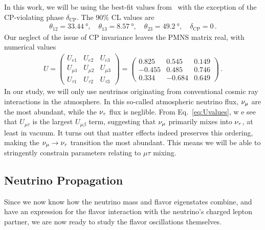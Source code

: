 In this work, we will be using the best-fit values from~\cite{nufit} with the exception of the CP-violating phase $\delta_\text{CP}$. The $90\% $ CL values are
\begin{align}\label{eq:nufitparams}
    \theta_{12} = \SI{33.44}{\degree},\hspace{1em} \theta_{13} = \SI{8.57}{\degree},\hspace{1em} \theta_{23} = \SI{49.2}{\degree}, \hspace{1em} \delta_\text{CP} = 0\,.
\end{align}
Our neglect of the issue of CP invariance leaves the PMNS matrix real, with numerical values 
\begin{align}\label{eq:Uvalues}
    U = \begin{pmatrix}
        U_{e 1} & U_{e2} & U_{e3} \\
        U_{\mu 1} & U_{\mu 2} & U_{\mu 3} \\
        U_{\tau 1} & U_{\tau 2} & U_{\tau 3}
    \end{pmatrix} 
    = \begin{pmatrix}
        0.825 & 0.545 & 0.149 \\
        -0.455 & 0.485 & 0.746 \\
        0.334 & -0.684 & 0.649
    \end{pmatrix} \,.
\end{align}
In our study, we will only use neutrinos originating from conventional cosmic ray interactions in the atmosphere. 
In this so-called atmospheric neutrino flux, $\nu_\mu$ are the most abundant, while the $\nu_\tau$ flux is neglible. From Eq.~\eqref{eq:Uvalues}, w
e see that $U_{\mu\tau}$ is the largest $U_{\mu\beta}$ term,
suggesting that $\nu_\mu$ primarily mixes into $\nu_\tau$, at least in vacuum. It turns out that matter effects indeed preserves this ordering, making the $\nu_\mu \to \nu_\tau$ transition
the most abundant. This means we will be able to stringently constrain parameters relating to $\mu\tau$ mixing.

\subsection{Neutrino Propagation}
Since we now know how the neutrino mass and flavor eigenstates combine, and have an expression for the flavor interaction with 
the neutrino's charged lepton partner, we are now ready to study the flavor oscillations themselves.

